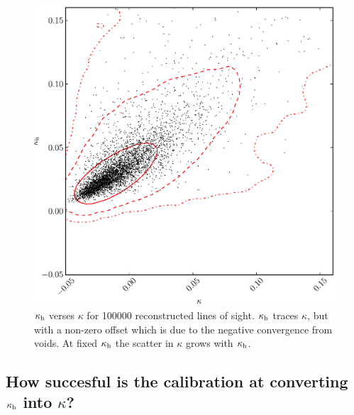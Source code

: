 \documentclass[useAMS,usenatbib]{mn2e}
\begin{document}
\begin{figure}
\includegraphics[width=\columnwidth]{figs/cornerplot.eps}
\caption[Biased?]{$\kappa_{\rm h}$ verses $\kappa$ for 100000 reconstructed lines of sight. $\kappa_{\rm h}$ traces $\kappa$, but with a non-zero offset which is due to the negative convergence from voids. At fixed $\kappa_{\rm h}$ the scatter in $\kappa$ grows with $\kappa_{\rm h}$.}
\label{fig:isitbiased}
\end{figure}


\subsection{How succesful is the calibration at converting $\kappa_{\rm h}$ into $\kappa$?}
\end{document}
